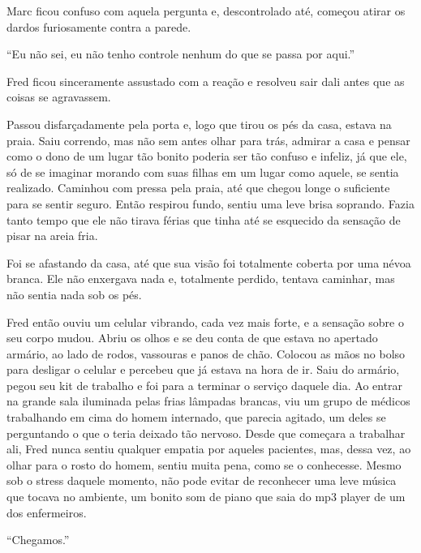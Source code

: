 Marc ficou confuso com aquela pergunta e, descontrolado até,
começou atirar os dardos furiosamente contra a parede.

``Eu não sei, eu não tenho controle nenhum do que se passa por aqui.''

Fred ficou sinceramente assustado com a reação e resolveu sair dali
antes que as coisas se agravassem.

Passou disfarçadamente pela porta e, logo que tirou os pés da casa,
estava na praia. Saiu correndo, mas não sem antes olhar para trás,
admirar a casa e pensar como o dono de um lugar tão bonito poderia ser
tão confuso e infeliz, já que ele, só de se imaginar morando com suas
filhas em um lugar como aquele, se sentia realizado. Caminhou com pressa
pela praia, até que chegou longe o suficiente para se sentir seguro.
Então respirou fundo, sentiu uma leve brisa soprando. Fazia tanto tempo
que ele não tirava férias que tinha até se esquecido da sensação de
pisar na areia fria.

Foi se afastando da casa, até que sua visão foi totalmente coberta por
uma névoa branca. Ele não enxergava nada e, totalmente perdido, tentava
caminhar, mas não sentia nada sob os pés.

Fred então ouviu um celular vibrando, cada vez mais forte, e a sensação
sobre o seu corpo mudou. Abriu os olhos e se deu conta de que estava no
apertado armário, ao lado de rodos, vassouras e panos de chão. Colocou
as mãos no bolso para desligar o celular e percebeu que já estava na
hora de ir. Saiu do armário, pegou seu kit de trabalho e foi para a 
terminar o serviço daquele dia. Ao entrar na grande sala iluminada pelas
frias lâmpadas brancas, viu um grupo de médicos trabalhando em cima do
homem internado, que parecia agitado, um deles se perguntando o que o
teria deixado tão nervoso. Desde que começara a trabalhar ali, Fred
nunca sentiu qualquer empatia por aqueles pacientes, mas, dessa vez, ao
olhar para o rosto do homem, sentiu muita pena, como se o conhecesse.
Mesmo sob o stress daquele momento, não pode evitar de reconhecer
uma leve música que tocava no ambiente, um bonito som de piano que saia
do mp3 player de um dos enfermeiros.

\asterisc


``Chegamos.''

